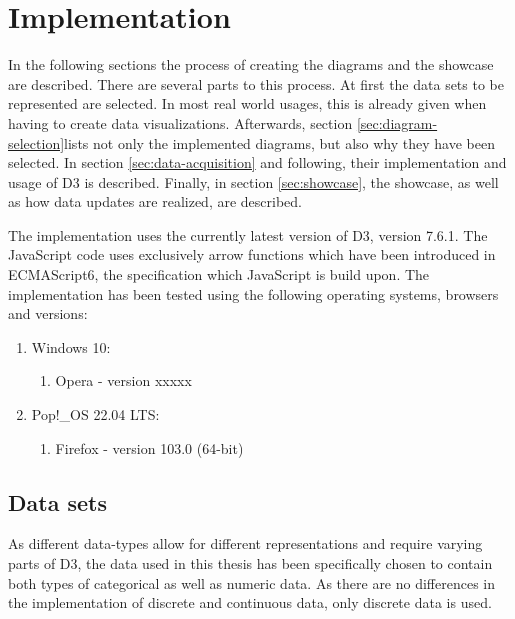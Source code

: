 \chapter{Implementation}


In the following sections the process of creating the diagrams and the showcase are described. There are several parts to this process. At first the data sets to be represented are selected. In most real world usages, this is already given when having to create data visualizations. Afterwards, section \ref{sec:diagram-selection}lists not only the implemented diagrams, but also why they have been selected. In section \ref{sec:data-acquisition} and following, their implementation and usage of D3 is described. Finally, in section \ref{sec:showcase}, the showcase, as well as how data updates are realized, are described.

The implementation uses the currently latest version of D3, version 7.6.1. The JavaScript code uses exclusively arrow functions which have been introduced in ECMAScript6, the specification which JavaScript is build upon\cite{ecmascript}. The implementation has been tested using the following operating systems, browsers and versions:
\begin{enumerate}
    \item Windows 10:
    \begin{enumerate}
        \item Opera - version xxxxx
    \end{enumerate}
    \item Pop!\_OS 22.04 LTS:
    \begin{enumerate}
        \item Firefox - version 103.0 (64-bit)
    \end{enumerate}
\end{enumerate}

\section{Data sets}
As different data-types allow for different representations and require varying parts of D3, the data used in this thesis has been specifically chosen to contain both types of categorical as well as numeric data. As there are no differences in the implementation of discrete and continuous data, only discrete data is used.


